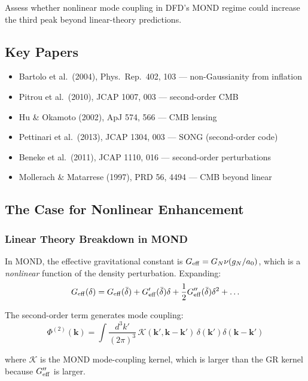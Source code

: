 \documentclass[11pt,a4paper]{article}
\begin{document}
Assess whether nonlinear mode coupling in DFD's MOND regime could increase the third peak beyond linear-theory predictions.

\subsection{Key Papers}

\begin{itemize}
\item Bartolo et al.\ (2004), Phys.\ Rep.\ 402, 103 --- non-Gaussianity from inflation
\item Pitrou et al.\ (2010), JCAP 1007, 003 --- second-order CMB
\item Hu \& Okamoto (2002), ApJ 574, 566 --- CMB lensing
\item Pettinari et al.\ (2013), JCAP 1304, 003 --- SONG (second-order code)
\item Beneke et al.\ (2011), JCAP 1110, 016 --- second-order perturbations
\item Mollerach \& Matarrese (1997), PRD 56, 4494 --- CMB beyond linear
\end{itemize}

\subsection{The Case for Nonlinear Enhancement}

\subsubsection{Linear Theory Breakdown in MOND}

In MOND, the effective gravitational constant is $G_{\rm eff} = G_N \nu(g_N/a_0)$, which is a \emph{nonlinear} function of the density perturbation. Expanding:
\begin{equation}
G_{\rm eff}(\delta) = G_{\rm eff}(\bar{\delta}) + G_{\rm eff}'(\bar{\delta})\delta + \frac{1}{2}G_{\rm eff}''(\bar{\delta})\delta^2 + \ldots
\end{equation}

The second-order term generates mode coupling:
\begin{equation}
\Phi^{(2)}(\mathbf{k}) = \int \frac{d^3k'}{(2\pi)^3}\,\mathcal{K}(\mathbf{k}',\mathbf{k}-\mathbf{k}')\,\delta(\mathbf{k}')\delta(\mathbf{k}-\mathbf{k}')
\end{equation}

where $\mathcal{K}$ is the MOND mode-coupling kernel, which is larger than the GR kernel because $G_{\rm eff}''$ is larger.
\end{document}
